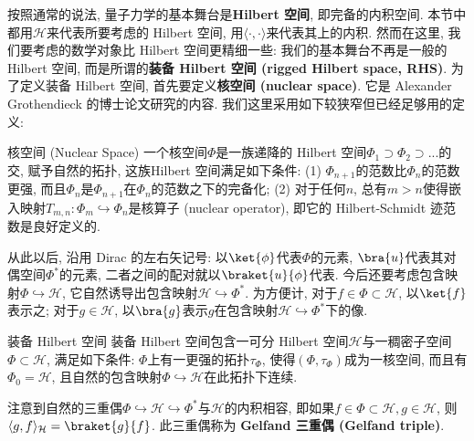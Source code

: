 
     按照通常的说法, 量子力学的基本舞台是\textbf{Hilbert 空间}, 即完备的内积空间. 本节中都用$\mathcal{H}$来代表所要考虑的 Hilbert 空间, 用$\langle\cdot,\cdot\rangle$来代表其上的内积. 然而在这里, 我们要考虑的数学对象比 Hilbert 空间更精细一些: 我们的基本舞台不再是一般的 Hilbert 空间, 而是所谓的\textbf{装备 Hilbert 空间 (rigged Hilbert space, RHS)}. 为了定义装备 Hilbert 空间, 首先要定义\textbf{核空间 (nuclear space)}. 它是 Alexander Grothendieck 的博士论文研究的内容. 我们这里采用如下较狭窄但已经足够用的定义:

\begin{definition}{核空间 (Nuclear Space)}
一个核空间$\Phi$是一族递降的 Hilbert 空间$\Phi_1\supset\Phi_2\supset...$的交, 赋予自然的拓扑, 这族Hilbert 空间满足如下条件: (1) $\Phi_{n+1}$的范数比$\Phi_n$的范数更强, 而且$\Phi_n$是$\Phi_{n+1}$在$\Phi_n$的范数之下的完备化; (2) 对于任何$n$, 总有$m>n$使得嵌入映射$T_{m,n}:\Phi_{m}\hookrightarrow\Phi_n$是核算子 (nuclear operator), 即它的 Hilbert-Schmidt 迹范数是良好定义的.
\end{definition}

    从此以后, 沿用 Dirac 的左右矢记号: 以$\ket{\phi}$代表$\Phi$的元素, $\bra{u}$代表其对偶空间$\Phi^*$的元素, 二者之间的配对就以$\braket{u}{\phi}$代表. 今后还要考虑包含映射$\Phi\hookrightarrow\mathcal{H}$, 它自然诱导出包含映射$\mathcal{H}\hookrightarrow\Phi^*$. 为方便计, 对于$f\in\Phi\subset\mathcal{H}$, 以$\ket{f}$表示之; 对于$g\in\mathcal{H}$, 以$\bra{g}$表示$g$在包含映射$\mathcal{H}\hookrightarrow\Phi^*$下的像.

\begin{definition}{装备 Hilbert 空间}
装备 Hilbert 空间包含一可分 Hilbert 空间$\mathcal{H}$与一稠密子空间$\Phi\subset\mathcal{H}$, 满足如下条件: $\Phi$上有一更强的拓扑$\tau_\Phi$, 使得$(\Phi,\tau_\Phi)$成为一核空间, 而且有$\Phi_0=\mathcal{H}$, 且自然的包含映射$\Phi\hookrightarrow\mathcal{H}$在此拓扑下连续.
\end{definition}

    注意到自然的三重偶$\Phi\hookrightarrow\mathcal{H}\hookrightarrow\Phi^*$与$\mathcal{H}$的内积相容, 即如果$f\in\Phi\subset\mathcal{H},g\in\mathcal{H}$, 则$\langle g,f\rangle_{\mathcal{H}}=\braket{g}{f}$. 此三重偶称为 \textbf{Gelfand 三重偶 (Gelfand triple)}.


